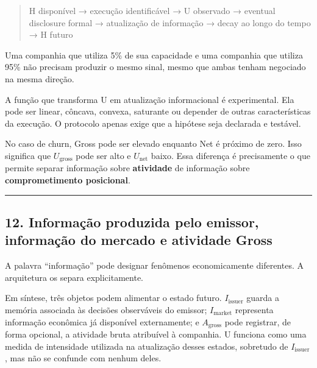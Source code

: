 \documentclass[
  a4paper,
]{article}
\begin{document}
\begin{quote}
H disponível → execução identificável → U observado → eventual
disclosure formal → atualização de informação → decay ao longo do tempo
→ H futuro
\end{quote}

Uma companhia que utiliza 5\% de sua capacidade e uma companhia que
utiliza 95\% não precisam produzir o mesmo sinal, mesmo que ambas tenham
negociado na mesma direção.

A função que transforma U em atualização informacional é experimental.
Ela pode ser linear, côncava, convexa, saturante ou depender de outras
características da execução. O protocolo apenas exige que a hipótese
seja declarada e testável.

No caso de churn, Gross pode ser elevado enquanto Net é próximo de zero.
Isso significa que \(U_{\mathrm{gross}}\) pode ser alto e
\(U_{\mathrm{net}}\) baixo. Essa diferença é precisamente o que permite
separar informação sobre \textbf{atividade} de informação sobre
\textbf{comprometimento posicional}.

\begin{center}\rule{0.5\linewidth}{0.5pt}\end{center}

\hypertarget{12-informacao-produzida-pelo-emissor-informacao-do-mercado-e-atividade-gross}{}

\hypertarget{12-informauxe7uxe3o-produzida-pelo-emissor-informauxe7uxe3o-do-mercado-e-atividade-gross}{%
\subsection{12. Informação produzida pelo emissor, informação do mercado
e atividade
Gross}\label{12-informauxe7uxe3o-produzida-pelo-emissor-informauxe7uxe3o-do-mercado-e-atividade-gross}}

A palavra ``informação'' pode designar fenômenos economicamente
diferentes. A arquitetura os separa explicitamente.

Em síntese, três objetos podem alimentar o estado futuro.
\textbf{\(I_{\mathrm{issuer}}\)} guarda a memória associada às decisões
observáveis do emissor; \textbf{\(I_{\mathrm{market}}\)} representa
informação econômica já disponível externamente; e
\textbf{\(A_{\mathrm{gross}}\)} pode registrar, de forma opcional, a
atividade bruta atribuível à companhia. U funciona como uma medida de
intensidade utilizada na atualização desses estados, sobretudo de
\(I_{\mathrm{issuer}}\), mas não se confunde com nenhum deles.
\end{document}
